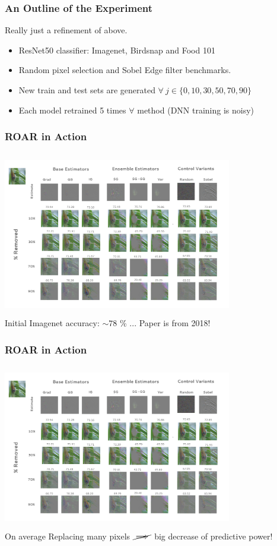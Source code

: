 \documentclass{beamer}
\theoremstyle{mystyle}
\begin{document}
\begin{frame}
	\frametitle{An Outline of the Experiment}
	Really just a refinement of above.
	\begin{itemize}
		\item ResNet50 classifier: Imagenet, Birdsnap and Food 101\pause
		\item Random pixel selection and Sobel Edge filter benchmarks.\pause
		\item  New train and test sets are generated  $\forall  \ j \in \{0,10,30,50,70,90\} $\pause
		\item Each model retrained 5 times $\forall $ method (DNN training is noisy) 
	\end{itemize}
\end{frame}

\begin{frame}
	\frametitle{ROAR in Action}
	\includegraphics[height=7.2cm, width=10cm]{ROAR_methods.png}\\ \pause
	Initial Imagenet accuracy: $\sim78$ \% ... \pause Paper is from 2018!
\end{frame}

\begin{frame}
	\frametitle{ROAR in Action}
	\includegraphics[height=7.2cm, width=10cm]{ROAR_methods.png}\\
	On average Replacing many pixels $\cancel{\implies}$ big decrease of predictive power! \pause

\end{frame}
\end{document}
